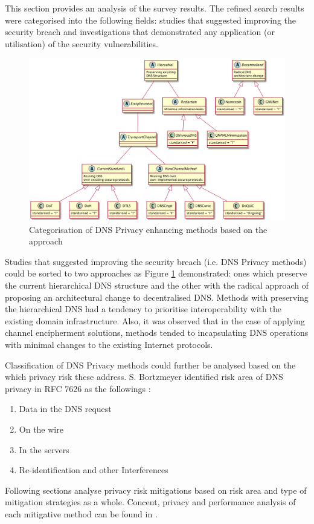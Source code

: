 This section provides an analysis of the survey results.
The refined search results were categorised into the following fields: studies that suggested improving the security breach and investigations that demonstrated any application (or utilisation) of the security vulnerabilities.

\begin{figure}[h!]
    \begin{center}
    \includegraphics*[width=1\columnwidth]{img/dnsprivacy-classification}
    \end{center}
    \caption{Categorisation of DNS Privacy enhancing methods based on the approach}
    \label{dns-methods-classification}
\end{figure}

Studies that suggested improving the security breach (i.e. DNS Privacy methods) could be sorted to two approaches as Figure \ref{dns-methods-classification} demonstrated: ones which preserve the current hierarchical DNS structure and the other with the radical approach of proposing an architectural change to decentralised DNS.
Methods with preserving the hierarchical DNS had a tendency to prioritise interoperability with the existing domain infrastructure. Also, it was observed that in the case of applying channel encipherment solutions, methods tended to incapsulating DNS operations with minimal changes to the existing Internet protocols.

Classification of DNS Privacy methods could further be analysed based on the which privacy risk these address. S. Bortzmeyer identified risk area of DNS privacy in RFC 7626 as the followings \cite{rfc7626}: 
\begin{enumerate}
    \item Data in the DNS request
    \item On the wire
    \item In the servers
    \item Re-identification and other Interferences
\end{enumerate}
Following sections analyse privacy risk mitigations based on risk area and type of mitigation strategies as a whole. Concent, privacy and performance analysis of each mitigative method can be found in \cite{van2018privacy}.

